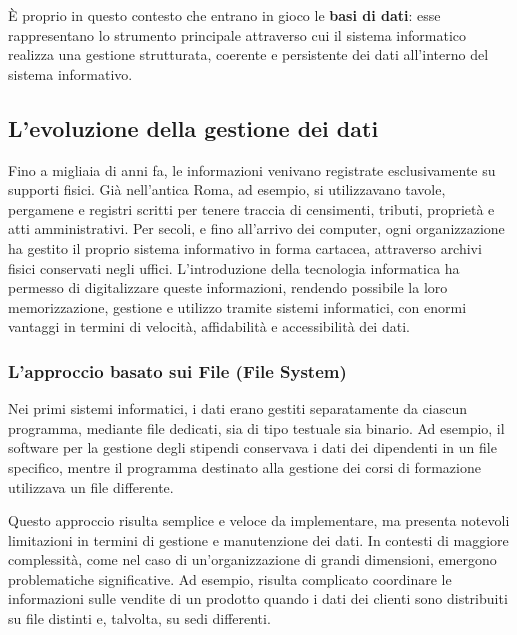 \documentclass[a4paper,12pt]{article}
\begin{document}
È proprio in questo contesto che entrano in gioco le \textbf{basi di dati}: esse rappresentano lo strumento principale attraverso cui il sistema informatico realizza una gestione strutturata, coerente e persistente dei dati all’interno del sistema informativo.



\subsection{L'evoluzione della gestione dei dati}

Fino a migliaia di anni fa, le informazioni venivano registrate esclusivamente su supporti fisici. Già nell’antica Roma, ad esempio, si utilizzavano tavole, pergamene e registri scritti per tenere traccia di censimenti, tributi, proprietà e atti amministrativi. Per secoli, e fino all’arrivo dei computer, ogni organizzazione ha gestito il proprio sistema informativo in forma cartacea, attraverso archivi fisici conservati negli uffici.
L’introduzione della tecnologia informatica ha permesso di digitalizzare queste informazioni, rendendo possibile la loro memorizzazione, gestione e utilizzo tramite sistemi informatici, con enormi vantaggi in termini di velocità, affidabilità e accessibilità dei dati.

\subsubsection{L’approccio basato sui File (File System)}
Nei primi sistemi informatici, i dati erano gestiti separatamente da ciascun programma, mediante file dedicati, sia di tipo testuale sia binario. Ad esempio, il software per la gestione degli stipendi conservava i dati dei dipendenti in un file specifico, mentre il programma destinato alla gestione dei corsi di formazione utilizzava un file differente.

Questo approccio risulta semplice e veloce da implementare, ma presenta notevoli limitazioni in termini di gestione e manutenzione dei dati. In contesti di maggiore complessità, come nel caso di un’organizzazione di grandi dimensioni, emergono problematiche significative. Ad esempio, risulta complicato coordinare le informazioni sulle vendite di un prodotto quando i dati dei clienti sono distribuiti su file distinti e, talvolta, su sedi differenti.
\end{document}
